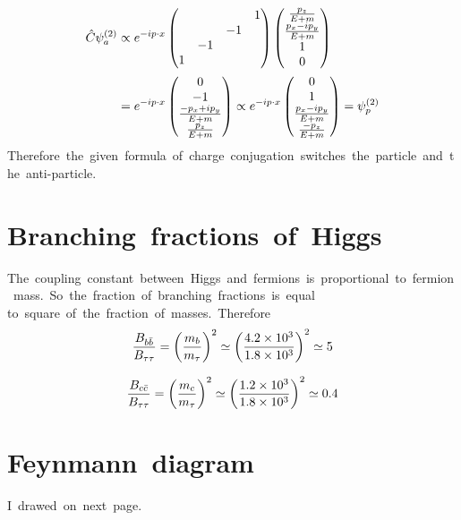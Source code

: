 \begin{align}
    \Hat{C}\psi^{(2)}_a&\propto e^{-ip\cdot x}\begin{pmatrix}
        &&&1\\
        &&-1&\\
        &-1&&\\
        1&&&
    \end{pmatrix}\begin{pmatrix}
        \frac{p_z}{E+m}\\
        \frac{p_x-ip_y}{E+m}\\
        1\\
        0
    \end{pmatrix}\nonumber\\
    &=e^{-ip\cdot x}\begin{pmatrix}
        0\\
        -1\\
        \frac{-p_x+ip_y}{E+m}\\
        \frac{p_z}{E+m}
    \end{pmatrix}\propto e^{-ip\cdot x}\begin{pmatrix}
        0\\
        1\\
        \frac{p_x-ip_y}{E+m}\\
        \frac{-p_z}{E+m}
    \end{pmatrix}=\psi^{(2)}_p
\end{align}
Therefore\ the\ given\ formula\ of\ charge\ conjugation\ switches\ the\ particle\ and\ the\ anti-particle.
\clearpage
\section{Branching\ fractions\ of\ Higgs}
The\ coupling\ constant\ between\ Higgs\ and\ fermions\ is\ proportional\ to\ fermion\ mass.\ So\ the\ fraction\ of\ branching\ fractions\ is\ equal to\ square\ of\ the\ fraction\ of\ masses.\ Therefore
\begin{align}
    \frac{B_{b\Bar{b}}}{B_{\tau\tau}}=\left(\frac{m_b}{m_{\tau}}\right)^2\simeq\left(\frac{4.2\times10^3}{1.8\times10^3}\right)^2\simeq5
\end{align}

\begin{align}
    \frac{B_{c\Bar{c}}}{B_{\tau\tau}}=\left(\frac{m_c}{m_{\tau}}\right)^2\simeq\left(\frac{1.2\times10^3}{1.8\times10^3}\right)^2\simeq0.4
\end{align}

\section{Feynmann\ diagram}
I\ drawed\ on\ next\ page.


